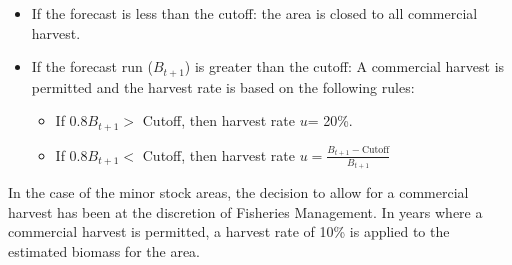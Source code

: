 \begin{itemize}
	\item If the forecast is less than the cutoff: the area is closed to all commercial harvest.
	\item If the forecast run ($B_{t+1}$) is greater than the cutoff: A commercial harvest is permitted and the harvest rate is based on the following rules:
	\begin{itemize}
		\item If $0.8B_{t+1} >$ Cutoff, then harvest rate $u$= 20\%.
		\item If $0.8B_{t+1} <$ Cutoff, then harvest rate $u = \frac{B_{t+1}-\mbox{Cutoff}}{B_{t+1}}$
	\end{itemize}
\end{itemize}

In the case of the minor stock areas, the decision to allow for a commercial harvest has been at the discretion of Fisheries Management. In years where a commercial harvest is permitted, a harvest rate of 10\% is applied to the estimated biomass for the area.

	
